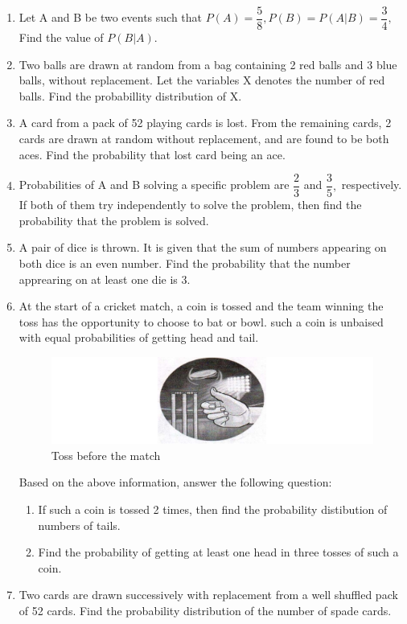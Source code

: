 \begin{enumerate}
\item Let A and B be two events such that $P(A) = \dfrac{5}{8}, P(B) = P(A|B) = \dfrac{3}{4},$ Find the value of $P(B|A)$.
\item Two balls are drawn at random from a bag containing 2 red balls and 3 blue balls, without replacement. Let the variables X denotes the number of red balls. Find the probabillity distribution of X.
\item A card from a pack of 52 playing cards is lost. From the remaining cards, 2 cards are drawn at random without replacement, and are found to be both aces. Find the probability that lost card being an ace.
\item Probabilities of A and B solving a specific problem are $\dfrac{2}{3}$ and $\dfrac{3}{5},$ respectively. If both of them try independently to solve the problem, then find the probability that the problem is  solved.
\item A pair of dice is thrown. It is given that the sum of numbers  appearing on both dice is an even number. Find the probability that the number apprearing on at least one die is 3.
\item At the start of a cricket match, a coin is tossed and the team winning the toss has the opportunity to choose to bat or bowl. such a coin is unbaised with equal probabilities of getting head and tail.
\begin{figure}[!ht]
\centering
\includegraphics[width=\columnwidth]{figs/coin}
\caption{Toss before the match}
\label{fig:coin1}
\end{figure}
\newline Based on the above information, answer the following question:
\begin{enumerate}
\item If such a coin is tossed 2 times, then find the probability distibution of numbers of tails.
\item Find the probability of getting at least one head in three tosses of such a coin.
\end{enumerate}
\item Two cards are drawn successively with replacement from a well shuffled pack of 52 cards. Find the probability distribution of the number of spade cards.

\end{enumerate}
